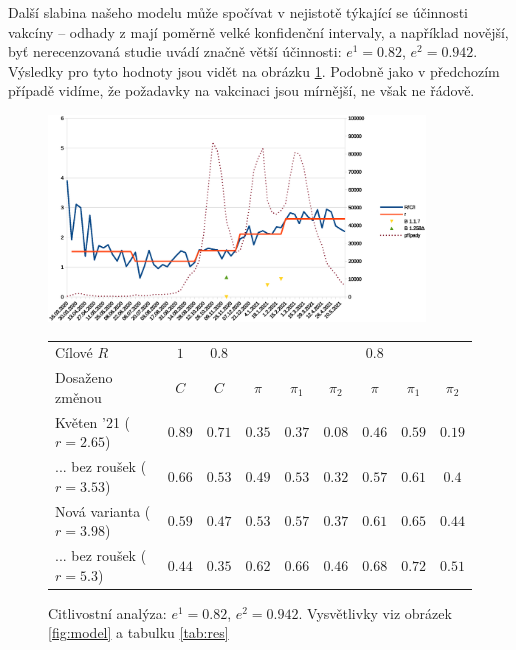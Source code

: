 Další slabina našeho modelu může spočívat v nejistotě týkající se účinnosti vakcíny
-- odhady z \cite{hall2021covid} mají poměrně velké konfidenční
intervaly, a například novější, byť nerecenzovaná studie \cite{shapiro2021efficacy}
uvádí značně větší účinnosti: $e^{1}=0.82$, $e^{2}=0.942$. Výsledky pro tyto hodnoty jsou vidět na obrázku \ref{fig:cv}. Podobně jako v předchozím případě vidíme, že požadavky na vakcinaci jsou mírnější, ne však ne řádově.

\begin{figure}
\begin{center}
\includegraphics[width=10cm]{pic/wholee} 

\begin{tabular}{l|c|c|ccc|ccc}									
Cílové $R$	& $1$	& $0.8$	&	&	&	& $0.8$	&	&	\\ 
Dosaženo změnou	& $C$	& $C$	& $\pi$	& $\pi_1$	& $\pi_2$	& $\pi$	& $\pi_1$	& $\pi_2$	\\ \hline
Květen '21 ($r=2.65$)	& $0.89$	& $0.71$	& $0.35$	& $0.37$	& $0.08$	& $0.46$	& $0.59$	& $0.19$	\\
... bez roušek ($r=3.53$)	& $0.66$	& $0.53$	& $0.49$	& $0.53$	& $0.32$	& $0.57$	& $0.61$	& $0.4$	\\
Nová varianta ($r=3.98$)	& $0.59$	& $0.47$	& $0.53$	& $0.57$	& $0.37$	& $0.61$	& $0.65$	& $0.44$	\\
... bez roušek ($r=5.3$)	& $0.44$	& $0.35$	& $0.62$	& $0.66$	& $0.46$	& $0.68$	& $0.72$	& $0.51$
\end{tabular}									

\caption{Citlivostní analýza: $e^{1}=0.82$, $e^{2}=0.942.$ Vysvětlivky viz obrázek \ref{fig:model} a tabulku \ref{tab:res}}
\label{fig:cv}

\end{center}
\end{figure}


